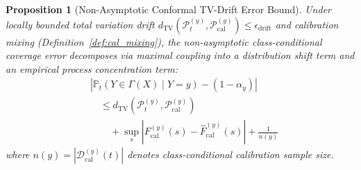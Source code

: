 \documentclass[a4paper,fleqn,twocolumn]{article}
\newtheorem{proposition}{Proposition}
\begin{document}
\begin{proposition}[Non-Asymptotic Conformal TV-Drift Error Bound]
\label{prop:conformal_tv_bound}
Under locally bounded total variation drift $d_{\mathrm{TV}}(\mathcal{P}_t^{(y)}, \mathcal{P}_{\text{cal}}^{(y)}) \le \epsilon_{\text{drift}}$ and calibration mixing (Definition~\ref{def:cal_mixing}), the non-asymptotic class-conditional coverage error decomposes via maximal coupling into a distribution shift term and an empirical process concentration term:
\begin{align}
&\left| \mathbb{P}_{t}\left(Y \in \Gamma(X) \mid Y=y\right) - (1 - \alpha_y) \right| \nonumber \\
&\quad \le d_{\mathrm{TV}}(\mathcal{P}_t^{(y)}, \mathcal{P}_{\text{cal}}^{(y)}) \nonumber \\
&\qquad + \sup_{s} \left| F_{\text{cal}}^{(y)}(s) - \hat{F}_{\text{cal}}^{(y)}(s) \right| + \frac{1}{n(y)}
\end{align}
where $n(y) = |\mathcal{D}_{\text{cal}}^{(y)}(t)|$ denotes class-conditional calibration sample size.
\end{proposition}
\end{document}
